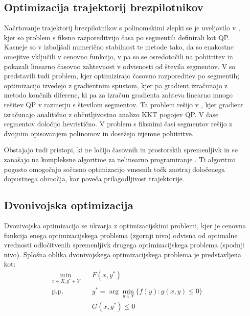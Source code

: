 \documentclass[mat2, tisk]{fmfdelo}
\begin{document}
\subsection{Optimizacija trajektorij brezpilotnikov}
Načrtovanje trajektorij brezpilotnikov s polinomskimi zlepki se je uveljavilo v \cite{mellinger2011minimum}, kjer so problem s fiksno razporeditvijo časa po segmentih definirali kot QP. Kasneje so v \cite{richter2016polynomial} izboljšali numerično stabilnost te metode tako, da so enakostne omejitve vključili v cenovno funkcijo, v \cite{burke2020generating} pa so se osredotočili na pohitritev in pokazali linearno časovno zahtevnost v odvisnosti od števila segmentov. V \cite{mellinger2011minimum} so predstavili tudi problem, kjer optimizirajo časovno razporeditev po segmentih; optimizacijo izvedejo z gradientnim spustom, kjer pa gradient izračunajo z metodo končnih diferenc, ki pa za izračun gradienta zahteva linearno mnogo rešitev QP v razmerju s številom segmentov. Ta problem rešijo v \cite{sun2021fast}, kjer gradient izračunajo analitično z občutljivostno analizo KKT pogojev QP. V \cite{gao2018online} čase segmentov določijo hevristično. V \cite{wang2021generating} problem s fiksnimi časi segmentov rešijo z dvojnim opisovanjem polinomov in dosežejo izjemne pohitritve.

Obstajajo tudi pristopi, ki ne ločijo časovnih in prostorskih spremenljivk \cite{zhou2020ego, fridovich2018planning} in se zanašajo na kompleksne algoritme za nelinearno programiranje \cite{wachter2006implementation}. Ti algoritmi pogosto omogočajo sočasno optimizacijo vmesnih točk znotraj določenega dopustnega območja, kar poveča prilagodljivost trajektorije.

\subsection{Dvonivojska optimizacija}
Dvonivojska optimizacija se ukvarja z optimizacijskimi problemi, kjer je cenovna funkcija enega optimizacijskega problema (zgornji nivo) odvisna od optimalne vrednosti odločitvenih spremenljivk drugega optimizacijskega problema (spodnji nivo). Splošna oblika dvonivojskega optimizacijskega problema je predstavljena kot:
\begin{equation}
    \begin{aligned}
        \min_{x\in X, y^*\in Y}& \quad F(x,y^*) \\
        \text{p.p.} & \quad y^* = \arg \min_{y\in Y} \{f(y) : g(x,y) \leq 0\} \\
        &\quad G(x,y^*) \leq 0
    \end{aligned}
\end{equation}
\end{document}
